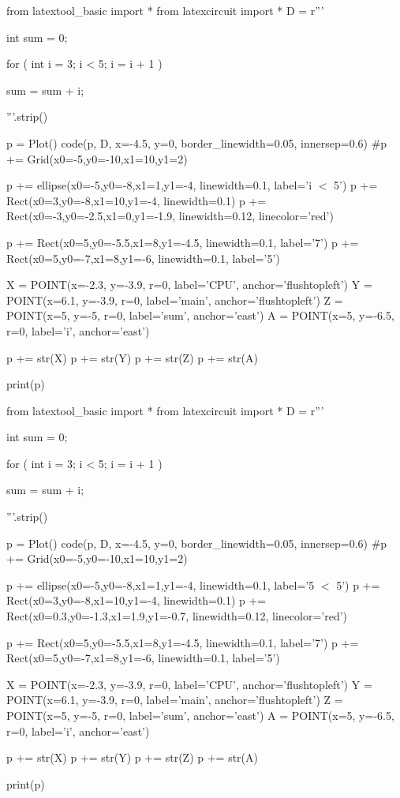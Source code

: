 \begin{python}
from latextool_basic import *
from latexcircuit import *
D = r'''



int sum = 0;

    for ( int i = 3;     i < 5;     i = i + 1 )


        sum = sum + i;



'''.strip()

p = Plot()
code(p, D, x=-4.5, y=0, border_linewidth=0.05, innersep=0.6)
#p += Grid(x0=-5,y0=-10,x1=10,y1=2)

p += ellipse(x0=-5,y0=-8,x1=1,y1=-4, linewidth=0.1, label='i $<$ 5')
p += Rect(x0=3,y0=-8,x1=10,y1=-4, linewidth=0.1)
p += Rect(x0=-3,y0=-2.5,x1=0,y1=-1.9, linewidth=0.12, linecolor='red')

p += Rect(x0=5,y0=-5.5,x1=8,y1=-4.5, linewidth=0.1, label='7')
p += Rect(x0=5,y0=-7,x1=8,y1=-6, linewidth=0.1, label='5')

X = POINT(x=-2.3, y=-3.9, r=0, label='CPU', anchor='flushtopleft')
Y = POINT(x=6.1, y=-3.9, r=0, label='main', anchor='flushtopleft')
Z = POINT(x=5, y=-5, r=0, label='sum', anchor='east')
A = POINT(x=5, y=-6.5, r=0, label='i', anchor='east')

p += str(X)
p += str(Y)
p += str(Z)
p += str(A)

print(p)
\end{python}

\begin{python}
from latextool_basic import *
from latexcircuit import *
D = r'''



int sum = 0;

    for ( int i = 3;     i < 5;     i = i + 1 )


        sum = sum + i;



'''.strip()

p = Plot()
code(p, D, x=-4.5, y=0, border_linewidth=0.05, innersep=0.6)
#p += Grid(x0=-5,y0=-10,x1=10,y1=2)

p += ellipse(x0=-5,y0=-8,x1=1,y1=-4, linewidth=0.1, label='5 $<$ 5')
p += Rect(x0=3,y0=-8,x1=10,y1=-4, linewidth=0.1)
p += Rect(x0=0.3,y0=-1.3,x1=1.9,y1=-0.7, linewidth=0.12, linecolor='red')

p += Rect(x0=5,y0=-5.5,x1=8,y1=-4.5, linewidth=0.1, label='7')
p += Rect(x0=5,y0=-7,x1=8,y1=-6, linewidth=0.1, label='5')

X = POINT(x=-2.3, y=-3.9, r=0, label='CPU', anchor='flushtopleft')
Y = POINT(x=6.1, y=-3.9, r=0, label='main', anchor='flushtopleft')
Z = POINT(x=5, y=-5, r=0, label='sum', anchor='east')
A = POINT(x=5, y=-6.5, r=0, label='i', anchor='east')

p += str(X)
p += str(Y)
p += str(Z)
p += str(A)

print(p)
\end{python}


